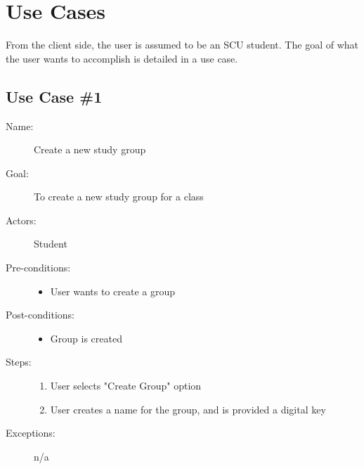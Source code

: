 \chapter{Use Cases}
From the client side, the user is assumed to be an SCU student. The goal of what the user wants to accomplish is detailed in a use case.

\section{Use Case \#1}
	\begin{description}
		\item[Name:] Create a new study group
		\item[Goal:] To create a new study group for a class
		\item[Actors:] Student
		\item[Pre-conditions:]
			\begin{itemize}
				\item User wants to create a group
			\end{itemize}
		\item[Post-conditions:]
			\begin{itemize}
				\item Group is created
			\end{itemize}
		\item[Steps:]
			\begin{enumerate}
				\item User selects "Create Group" option
				\item User creates a name for the group, and is provided a digital key
			\end{enumerate}
		\item[Exceptions:] n/a		
	\end{description}

